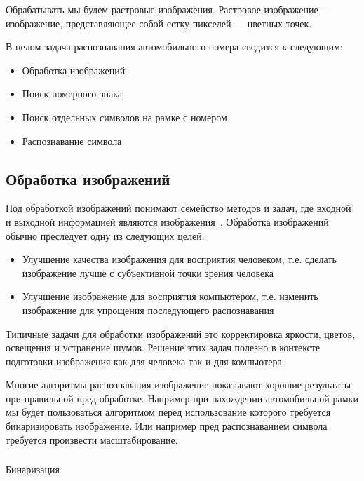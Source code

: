 Обрабатывать мы будем растровые изображения. Растровое изображение — изображение, представляющее собой сетку пикселей — цветных точек.

В целом задача распознавания автомобильного номера сводится к следующим: 
\begin{itemize}
  \item Обработка изображений
  \item Поиск номерного знака
  \item Поиск отдельных символов на рамке с номером
  \item Распознавание символа
\end{itemize}

\subsection{Обработка изображений}
\label{sub:domain:image_processing}
Под обработкой  изображений понимают семейство  методов  и  задач,  где  входной  и  выходной информацией  являются  изображения~\cite{misoi_clides}. Обработка изображений обычно преследует одну из следующих целей:
\begin{itemize}
  \item Улучшение качества изображения для восприятия человеком, т.е. сделать изображение лучше с субъективной точки зрения человека
  \item Улучшение изображение для восприятия компьютером, т.е. изменить изображение для упрощения последующего распознавания
\end{itemize}
Типичные задачи для обработки изображений это корректировка яркости, цветов, освещения и устранение шумов. Решение этих задач полезно в контексте подготовки изображения как для человека так и для компьютера. 

Многие алгоритмы распознавания изображение показывают хорошие результаты при правильной пред-обработке. Например при нахождении автомобильной рамки мы будет пользоваться алгоритмом \segmentation{} перед использование которого требуется бинаризировать изображение. Или например пред распознаванием символа требуется произвести масштабирование.

\subsubsection{}
\label{sub:domain:image_processing:binary}
Бинаризация

